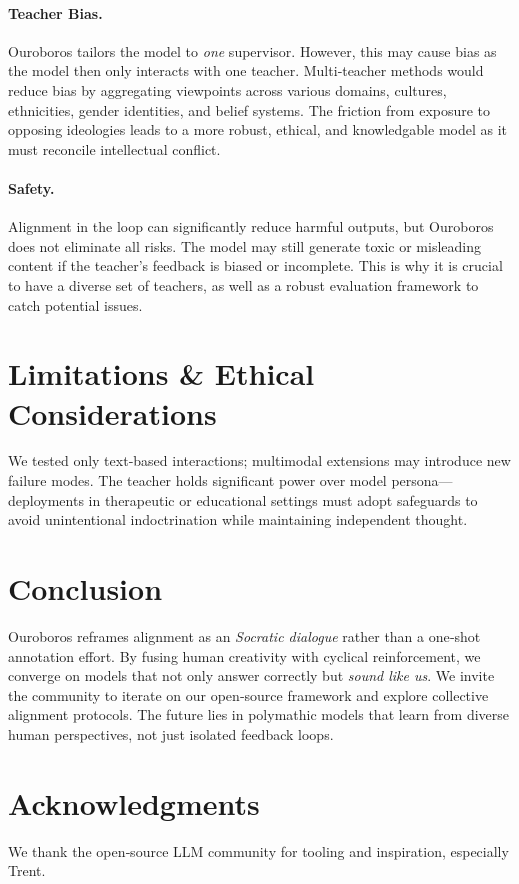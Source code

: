 \documentclass[11pt]{article}
\begin{document}
\paragraph{Teacher Bias.} Ouroboros tailors the model to \emph{one} supervisor.  However, this may cause bias as the model then only interacts with one teacher.  Multi‑teacher methods would reduce bias by aggregating viewpoints across various domains, cultures, ethnicities, gender identities, and belief systems.  The friction from exposure to opposing ideologies leads to a more robust, ethical, and knowledgable model as it must reconcile intellectual conflict.%
\paragraph{Safety.} Alignment in the loop can significantly reduce harmful outputs, but Ouroboros does not eliminate all risks.  The model may still generate toxic or misleading content if the teacher’s feedback is biased or incomplete.  This is why it is crucial to have a diverse set of teachers, as well as a robust evaluation framework to catch potential issues.

\section{Limitations \& Ethical Considerations}
We tested only text‑based interactions; multimodal extensions may introduce new failure modes.  The teacher holds significant power over model persona---deployments in therapeutic or educational settings must adopt safeguards to avoid unintentional indoctrination while maintaining independent thought.

\section{Conclusion}
Ouroboros reframes alignment as an \emph{Socratic dialogue} rather than a one‑shot annotation effort.  By fusing human creativity with cyclical reinforcement, we converge on models that not only answer correctly but \emph{sound like us}.  We invite the community to iterate on our open‑source framework and explore collective alignment protocols. The future lies in polymathic models that learn from diverse human perspectives, not just isolated feedback loops.

\section*{Acknowledgments}
We thank the open‑source LLM community for tooling and inspiration, especially Trent.
\end{document}

